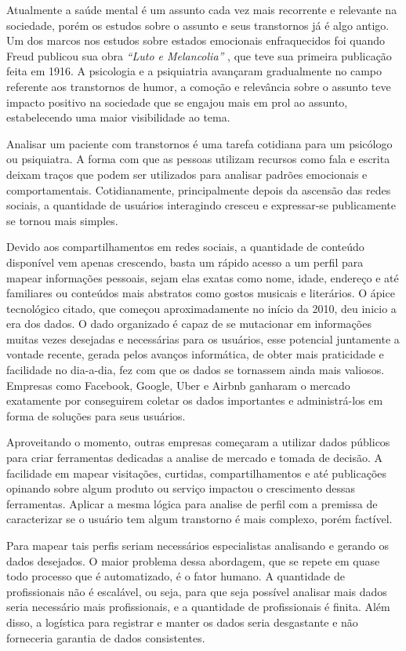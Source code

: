 Atualmente a saúde mental é um assunto cada vez mais recorrente e relevante na sociedade, porém os estudos sobre o assunto e seus transtornos já é algo antigo. Um dos marcos nos estudos sobre estados emocionais enfraquecidos foi quando Freud publicou sua obra \textit{“Luto e Melancolia”} \cite{freud2014livro}, que teve sua primeira publicação feita em 1916. A psicologia e a psiquiatria avançaram gradualmente no campo referente aos transtornos de humor, a comoção e relevância sobre o assunto teve impacto positivo na sociedade que se engajou mais em prol ao assunto, estabelecendo uma maior visibilidade ao tema.

Analisar um paciente com transtornos é uma tarefa cotidiana para um psicólogo ou psiquiatra. A forma com que as pessoas utilizam recursos como fala e escrita deixam traços que podem ser utilizados para analisar padrões emocionais e comportamentais. Cotidianamente, principalmente depois da ascensão das redes sociais, a quantidade de usuários interagindo cresceu e expressar-se publicamente se tornou mais simples.

Devido aos compartilhamentos em redes sociais, a quantidade de conteúdo disponível vem apenas crescendo, basta um rápido acesso a um perfil para mapear informações pessoais, sejam elas exatas como nome, idade, endereço e até familiares ou conteúdos mais abstratos como gostos musicais e literários. O ápice tecnológico citado, que começou aproximadamente no início da 2010, deu inicio a era dos dados. O dado organizado é capaz de se mutacionar em informações muitas vezes desejadas e necessárias para os usuários, esse potencial juntamente a vontade recente, gerada pelos avanços informática, de obter mais praticidade e facilidade no dia-a-dia, fez com que os dados se tornassem ainda mais valiosos. Empresas como Facebook, Google, Uber e Airbnb ganharam o mercado exatamente por conseguirem coletar os dados importantes e administrá-los em forma de soluções para seus usuários.

Aproveitando o momento, outras empresas começaram a utilizar dados públicos para criar ferramentas dedicadas a analise de mercado e tomada de decisão. A facilidade em mapear visitações, curtidas, compartilhamentos e até publicações opinando sobre algum produto ou serviço impactou o crescimento dessas ferramentas. Aplicar a mesma lógica para analise de perfil com a premissa de caracterizar se o usuário tem algum transtorno é mais complexo, porém factível.

Para mapear tais perfis seriam necessários especialistas analisando e gerando os dados desejados. O maior problema dessa abordagem, que se repete em quase todo processo que é automatizado, é o fator humano. A quantidade de profissionais não é escalável, ou seja, para que seja possível analisar mais dados seria necessário mais profissionais, e a quantidade de profissionais é finita. Além disso, a logística para registrar e manter os dados seria desgastante e não forneceria garantia de dados consistentes.

